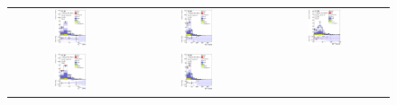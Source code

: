 \begin{figure}[tp]
  \centering
  \begin{tabular}{ccc}
  \includegraphics[width=0.27\textwidth]{Analysis/Figures_ttH/tesis_vars/prefit/lep_pt_4jetex4btagin.eps} &
  \includegraphics[width=0.27\textwidth]{Analysis/Figures_ttH/tesis_vars/prefit/met_4jetex4btagin.eps} &
  \includegraphics[width=0.27\textwidth]{Analysis/Figures_ttH/tesis_vars/prefit/WlepMT_4jetex4btagin.eps} \\
  \includegraphics[width=0.27\textwidth]{Analysis/Figures_ttH/tesis_vars/postfit/lep_pt_4jetex4btagin.eps} &
  \includegraphics[width=0.27\textwidth]{Analysis/Figures_ttH/tesis_vars/postfit/met_4jetex4btagin.eps} &

\end{tabular}
\end{figure}
